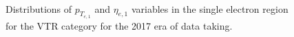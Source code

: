 \begin{figure}[htbp]
  \centering
    \\
  \caption{Distributions of $p_{T_{e,1}}$ and $\eta_{e,1}$ variables in the single electron region for the VTR category for the 2017 era of data taking.}
  \label{app:2017_Wenu_1}
\end{figure}
\newpage

